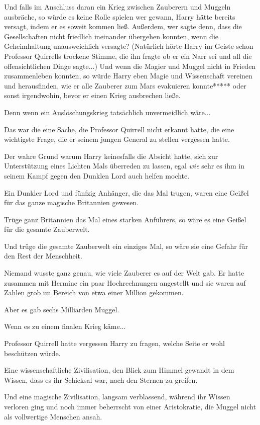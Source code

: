 {Und falls im Anschluss daran ein Krieg zwischen Zauberern und Muggeln ausbräche, so würde es keine Rolle spielen wer gewann, Harry hätte bereits versagt, indem er es soweit kommen ließ. Außerdem, wer sagte denn, dass die Gesellschaften nicht friedlich ineinander übergehen konnten, wenn die Geheimhaltung unausweichlich versagte? (Natürlich hörte Harry im Geiste schon Professor Quirrells trockene Stimme, die ihn fragte ob er ein Narr sei und all die offensichtlichen Dinge sagte...) Und wenn die Magier und Muggel nicht in Frieden zusammenleben konnten, so würde Harry eben Magie und Wissenschaft vereinen und herausfinden, wie er alle Zauberer zum Mars evakuieren konnte***** oder sonst irgendwohin, bevor er einen Krieg ausbrechen ließe.

Denn wenn ein Auslöschungskrieg tatsächlich unvermeidlich wäre...

Das war die eine Sache, die Professor Quirrell nicht erkannt hatte, die eine wichtigste Frage, die er seinem jungen General zu stellen vergessen hatte.

Der wahre Grund warum Harry keinesfalls die Absicht hatte, sich zur Unterstützung eines Lichten Mals überreden zu lassen, egal \emph{wie} sehr es ihm in seinem Kampf gegen den Dunklen Lord auch helfen mochte.

Ein Dunkler Lord und fünfzig Anhänger, die das Mal trugen, waren eine Geißel für das ganze magische Britannien gewesen.

Trüge ganz Britannien das Mal eines starken Anführers, so wäre es eine Geißel für die gesamte Zauberwelt.

Und trüge die gesamte Zauberwelt ein einziges Mal, so wäre sie eine Gefahr für den Rest der Menschheit.

Niemand wusste ganz genau, wie viele Zauberer es auf der Welt gab. Er hatte zusammen mit Hermine ein paar Hochrechnungen angestellt und sie waren auf Zahlen grob im Bereich von etwa einer Million gekommen.

Aber es gab sechs Milliarden Muggel.

Wenn es zu einem finalen Krieg käme...

Professor Quirrell hatte vergessen Harry zu fragen, welche Seite er wohl beschützen würde.

Eine wissenschaftliche Zivilisation, den Blick zum Himmel gewandt in dem Wissen, dass es ihr Schicksal war, nach den Sternen zu greifen.

Und eine magische Zivilisation, langsam verblassend, während ihr Wissen verloren ging und noch immer beherrscht von einer Aristokratie, die Muggel nicht als vollwertige Menschen ansah.

}
